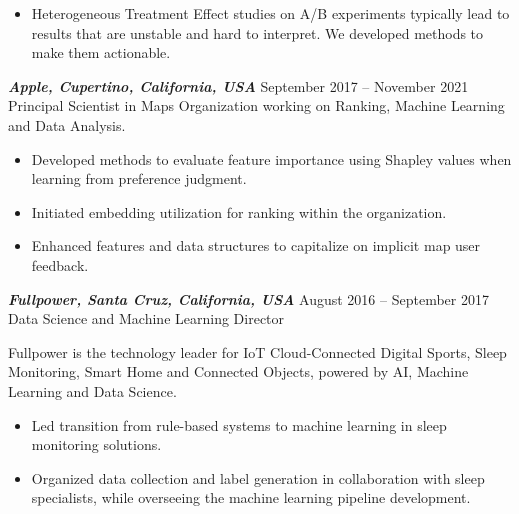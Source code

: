 \documentclass[10pt]{res} %
\begin{document}
\begin{resume}
\begin{itemize}
\item Heterogeneous Treatment Effect studies on A/B
  experiments typically lead to results that are unstable and hard to
  interpret. We developed methods to make them actionable.
\end{itemize}


{\sl \textbf{Apple, Cupertino, California, USA}} \hfill September 2017 -- November 2021 \\
Principal Scientist in Maps Organization working on Ranking, Machine Learning and Data Analysis.

\vspace{8pt}

\begin{itemize}
\item Developed methods to evaluate feature importance using Shapley
  values when learning from preference judgment.
  
\item Initiated embedding utilization for ranking within the
  organization.
  
\item Enhanced features and data structures to capitalize on implicit
  map user feedback.
\end{itemize}


{\sl \textbf{Fullpower, Santa Cruz, California, USA}} \hfill August 2016 -- September 2017 \\
Data Science and Machine Learning Director

\vspace{8pt}

Fullpower is the technology leader for IoT Cloud-Connected Digital
Sports, Sleep Monitoring, Smart Home and Connected Objects, powered by
AI, Machine Learning and Data Science.

\begin{itemize}
\item Led transition from rule-based systems to machine learning in
  sleep monitoring solutions.
  
\item Organized data collection and label generation in collaboration
  with sleep specialists, while overseeing the machine learning
  pipeline development.
  
\end{itemize}



\end{resume}
\end{document}
